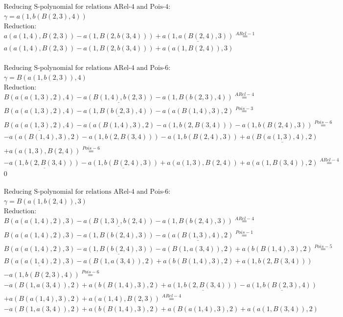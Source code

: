 \documentclass[11pt]{amsart}
\begin{document}
\begin{align*} 
& \text{Reducing S-polynomial for relations ARel-4 and Pois-4:} \\ 
& \gamma = a(1,b(B(2,3),4)) \\ 
& \text{Reduction}: \\&a(a(1,4),B(2,3)) - a(1,B(2,b(3,4))) + \underline{a(1,a(B(2,4),3))} \stackrel{ ARel-1 }{=}  \\ 
&a(a(1,4),B(2,3)) - a(1,B(2,b(3,4))) + a(a(1,B(2,4)),3)\\ 
\end{align*} 
 
\begin{align*} 
& \text{Reducing S-polynomial for relations ARel-4 and Pois-6:} \\ 
& \gamma = B(a(1,b(2,3)),4) \\ 
& \text{Reduction}: \\&B(a(a(1,3),2),4) - \underline{a(B(1,4),b(2,3))} - a(1,B(b(2,3),4)) \stackrel{ ARel-4 }{=}  \\ 
&B(a(a(1,3),2),4) - \underline{a(1,B(b(2,3),4))} - a(a(B(1,4),3),2) \stackrel{ Pois-3 }{=}  \\ 
&\underline{B(a(a(1,3),2),4)} - a(a(B(1,4),3),2) - a(1,b(2,B(3,4))) - a(1,b(B(2,4),3)) \stackrel{ Pois-6 }{=}  \\ 
& - a(a(B(1,4),3),2) - a(1,b(2,B(3,4))) - a(1,b(B(2,4),3)) + \underline{a(B(a(1,3),4),2)}\\ 
 &  + a(a(1,3),B(2,4)) \stackrel{ Pois-6 }{=}  \\ 
& - \underline{a(1,b(2,B(3,4)))} - \underline{a(1,b(B(2,4),3))} + a(a(1,3),B(2,4)) + a(a(1,B(3,4)),2) \stackrel{ ARel-4 }{=}  \\ 
&0\\ 
\end{align*} 
 
\begin{align*} 
& \text{Reducing S-polynomial for relations ARel-4 and Pois-6:} \\ 
& \gamma = B(a(1,b(2,4)),3) \\ 
& \text{Reduction}: \\&B(a(a(1,4),2),3) - \underline{a(B(1,3),b(2,4))} - a(1,B(b(2,4),3)) \stackrel{ ARel-4 }{=}  \\ 
&B(a(a(1,4),2),3) - a(1,B(b(2,4),3)) - \underline{a(a(B(1,3),4),2)} \stackrel{ Pois-1 }{=}  \\ 
&B(a(a(1,4),2),3) - \underline{a(1,B(b(2,4),3))} - a(B(1,a(3,4)),2) + a(b(B(1,4),3),2) \stackrel{ Pois-5 }{=}  \\ 
&\underline{B(a(a(1,4),2),3)} - a(B(1,a(3,4)),2) + a(b(B(1,4),3),2) + a(1,b(2,B(3,4)))\\ 
 &  - a(1,b(B(2,3),4)) \stackrel{ Pois-6 }{=}  \\ 
& - a(B(1,a(3,4)),2) + a(b(B(1,4),3),2) + \underline{a(1,b(2,B(3,4)))} - \underline{a(1,b(B(2,3),4))}\\ 
 &  + a(B(a(1,4),3),2) + a(a(1,4),B(2,3)) \stackrel{ ARel-4 }{=}  \\ 
& - a(B(1,a(3,4)),2) + a(b(B(1,4),3),2) + a(B(a(1,4),3),2) + a(a(1,B(3,4)),2)\\ 
\end{align*} 
 
\end{document}
